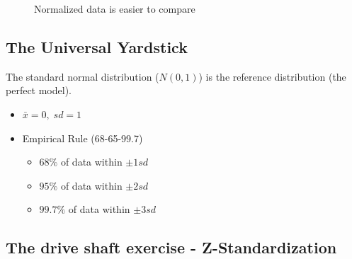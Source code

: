 \documentclass[
  a4paper,
]{scrbook}
\providecommand{\tightlist}{%
  \setlength{\itemsep}{0pt}\setlength{\parskip}{0pt}}\usepackage{longtable,booktabs,array}
\begin{document}
\begin{figure}[ht]


\caption{\label{fig-z-scores-scaled}Normalized data is easier to
compare}

\end{figure}%

\subsection{The Universal Yardstick}\label{the-universal-yardstick}

The standard normal distribution (\(N(0,1)\)) is the reference
distribution (the perfect model).

\begin{itemize}
\tightlist
\item
  \(\bar{x} = 0,\; sd = 1\)
\item
  Empirical Rule (68-65-99.7)

  \begin{itemize}
  \tightlist
  \item
    \(68\%\) of data within \(\pm1sd\)
  \item
    \(95\%\) of data within \(\pm2sd\)
  \item
    \(99.7\%\) of data within \(\pm3sd\)
  \end{itemize}
\end{itemize}

\subsection{The drive shaft exercise -
Z-Standardization}\label{the-drive-shaft-exercise---z-standardization}
\end{document}
